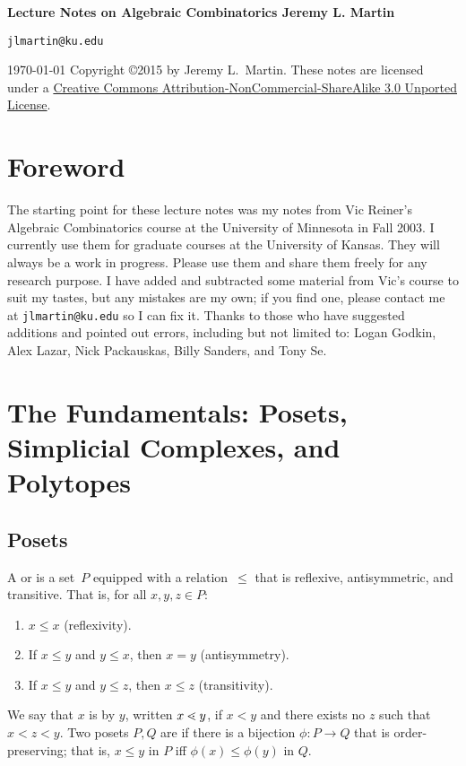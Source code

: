 

\thispagestyle{empty}
\begin{center}
\vfill
\Huge\bf
Lecture Notes on Algebraic Combinatorics\rm
\vfill
Jeremy L. Martin
\medskip

{\tt jlmartin@ku.edu}
\medskip

\today
\vfill
\normalsize
Copyright \copyright 2015 by Jeremy L.\ Martin.  These notes are
licensed under
a \href{http://creativecommons.org/licenses/by-nc-sa/3.0/deed.en_US}
{Creative Commons Attribution-NonCommercial-ShareAlike 3.0 Unported License}.
\end{center}
\pagebreak
\section*{Foreword}
The starting point for these lecture notes was my notes from Vic
Reiner's Algebraic Combinatorics course at the University of Minnesota
in Fall 2003.  I currently use them for graduate courses at the
University of Kansas.  They will always be a work in
progress.  Please use them and share them freely for any research
purpose.  I have added and subtracted some material from Vic's course
to suit my tastes, but any mistakes are my own; if you find one,
please contact me at {\tt jlmartin@ku.edu} so I can fix it.
Thanks to those who have suggested additions and pointed out errors,
including but not limited to: Logan Godkin, Alex Lazar, Nick Packauskas, Billy Sanders,
and Tony Se.


\section{The Fundamentals: Posets, Simplicial Complexes, and Polytopes}

\subsection{Posets}

\begin{definition}
A  or  is a set~$P$ equipped with a relation~$\leq$ that is reflexive, antisymmetric, and transitive.  That is, for all $x,y,z\in P$:
\begin{enumerate}
\item $x\leq x$ (reflexivity).
\item If $x\leq y$ and $y\leq x$, then $x=y$ (antisymmetry).
\item If $x\leq y$ and $y\leq z$, then $x\leq z$ (transitivity).
\end{enumerate}
We say that $x$ is  by $y$, written $x\lessdot y$, if $x<y$
and there exists no $z$ such that $x<z<y$.  Two posets $P,Q$ are  if there is a bijection $\phi:P\to Q$ that is order-preserving; that is, $x\leq y$ in $P$ iff $\phi(x)\leq\phi(y)$ in $Q$.
\end{definition}

